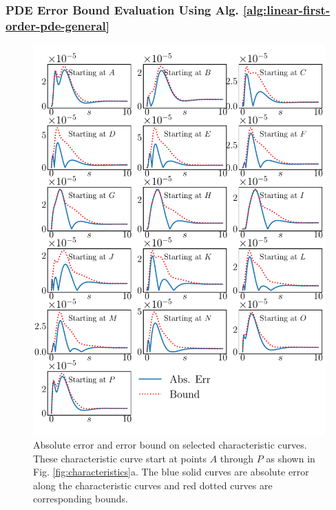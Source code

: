 \documentclass[accepted]{uai2023}
\begin{document}
\subsubsection{PDE Error Bound Evaluation Using Alg. \ref{alg:linear-first-order-pde-general}}
    \begin{figure}[!ht]
        \centering
        \includegraphics[width=\linewidth]{assets/pde-error-bound.pdf}
        \caption{
            \small
            Absolute error and error bound on selected characteristic curves. 
            These characteristic curve start at points $A$ through $P$ as shown in Fig. \ref{fig:characteristics}a.
            The blue solid curves are absolute error along the characteristic curves and red dotted curves are corresponding bounds.
        }\label{fig:pde-error-bound}
    \end{figure}
\end{document}
